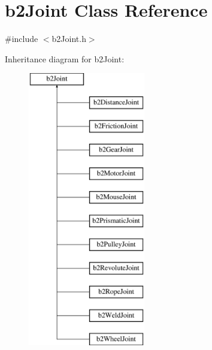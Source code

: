 \hypertarget{classb2Joint}{}\section{b2\+Joint Class Reference}
\label{classb2Joint}


{\ttfamily \#include $<$b2\+Joint.\+h$>$}

Inheritance diagram for b2\+Joint\+:\begin{figure}[H]
\begin{center}
\leavevmode
\includegraphics[height=12.000000cm]{classb2Joint}
\end{center}
\end{figure}
